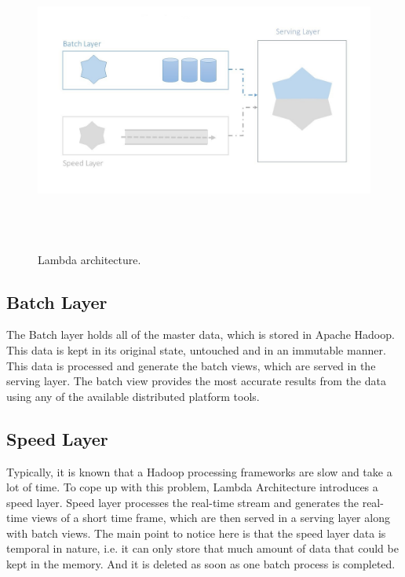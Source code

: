 \begin{figure}[htpb]
	\centering
	\includegraphics[width=12cm,height=10cm,keepaspectratio=true]{images/lambda_arc}
	\caption{
		Lambda architecture.
	}
	\label{fig:lambda_arc}
\end{figure}



\subsection{Batch Layer}
The Batch layer holds all of the master data, which is stored in Apache Hadoop. This data is kept in its original state, untouched and in an immutable manner. This data is processed and generate the batch views, which are served in the serving layer. The batch view provides the most accurate results from the data using any of the available distributed platform tools.

\subsection{Speed Layer}
Typically, it is known that a Hadoop processing frameworks are slow and take a lot of time. To cope up with this problem, Lambda Architecture introduces a speed layer. Speed layer processes the real-time stream and generates the real-time views of a short time frame, which are then served in a serving layer along with batch views. The main point to notice here is that the speed layer data is temporal in nature, i.e. it can only store that much amount of data that could be kept in the memory. And it is deleted as soon as one batch process is completed.

